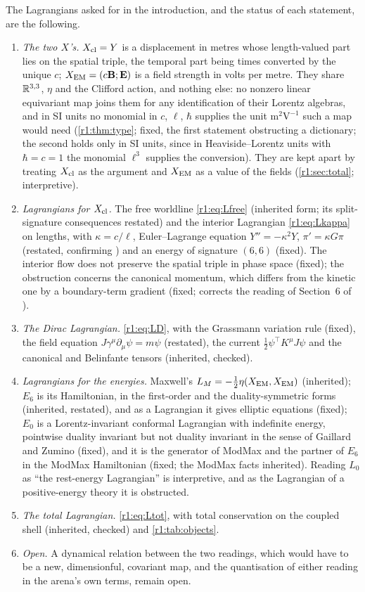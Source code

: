 The Lagrangians asked for in the introduction, and the status of each statement, are the following.
\begin{enumerate}[label=(\arabic*),leftmargin=2.2em]
\item \emph{The two $X$'s.} $X_{\rm cl}=Y$ is a displacement in metres whose length-valued part lies on the spatial triple, the temporal
part being times converted by the unique $c$; $X_{\rm EM}=(c\mathbf B;\mathbf E)$ is a field strength in volts per metre. They share $\mathbb{R}^{3,3}$, $\eta$
and the Clifford action, and nothing else: no nonzero linear equivariant map joins them for any identification of their Lorentz algebras,
and in SI units no monomial in $c$, $\ell$, $\hbar$ supplies the unit $\mathrm{m^2V^{-1}}$ such a map would need (\cref{r1:thm:type};
fixed, the first statement obstructing a dictionary; the second holds only in SI units, since in Heaviside--Lorentz units with
$\hbar=c=1$ the monomial $\ell^3$ supplies the conversion). They are kept apart by treating $X_{\rm cl}$ as the argument and $X_{\rm EM}$ as a value of the fields
(\cref{r1:sec:total}; interpretive).
\item \emph{Lagrangians for $X_{\rm cl}$.} The free worldline \eqref{r1:eq:Lfree} (inherited form; its split-signature consequences restated)
and the interior Lagrangian \eqref{r1:eq:Lkappa} on lengths, with $\kappa=c/\ell$, Euler--Lagrange equation $Y''=-\kappa^2Y$, $\pi'=\kappa G\pi$
(restated, confirming \cite{FMB}) and an energy of signature $(6,6)$ (fixed). The interior flow does not preserve the spatial triple in phase
space (fixed); the obstruction concerns the canonical momentum, which differs from the kinetic one by a boundary-term gradient (fixed;
corrects the reading of Section~6 of \cite{FMB}).
\item \emph{The Dirac Lagrangian.} \eqref{r1:eq:LD}, with the Grassmann variation rule (fixed), the field equation
$J\gamma^\mu\partial_\mu\psi=m\psi$ (restated), the current $\tfrac12\psi^{\!\top}K^\mu J\psi$ and the canonical and Belinfante tensors
(inherited, checked).
\item \emph{Lagrangians for the energies.} Maxwell's $L_M=-\tfrac12\eta(X_{\rm EM},X_{\rm EM})$ (inherited); $E_6$ is its Hamiltonian, in the
first-order and the duality-symmetric forms (inherited, restated), and as a Lagrangian it gives elliptic equations (fixed); $E_0$ is a
Lorentz-invariant conformal Lagrangian with indefinite energy, pointwise duality invariant but not duality invariant in the sense of
Gaillard and Zumino (fixed), and it is the generator of ModMax and the
partner of $E_6$ in the ModMax Hamiltonian (fixed; the ModMax facts inherited). Reading $L_0$ as ``the rest-energy Lagrangian'' is
interpretive, and as the Lagrangian of a positive-energy theory it is obstructed.
\item \emph{The total Lagrangian.} \eqref{r1:eq:Ltot}, with total conservation on the coupled shell (inherited, checked) and
\cref{r1:tab:objects}.
\item \emph{Open.} A dynamical relation between the two readings, which would have to be a new, dimensionful, covariant map, and the
quantisation of either reading in the arena's own terms, remain open.
\end{enumerate}
